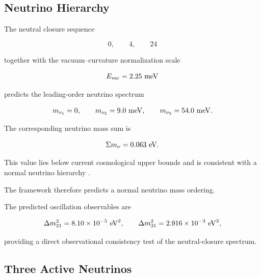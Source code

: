 \documentclass[11pt]{article}
\theoremstyle{definition}
\theoremstyle{remark}
\begin{document}

\subsection{Neutrino Hierarchy}
\label{subsec:prediction_neutrino_hierarchy}

The neutral closure sequence

\begin{equation}
0,
\qquad
4,
\qquad
24
\end{equation}

together with the vacuum--curvature normalization scale

\begin{equation}
E_{\rm vac}
=
2.25~{\rm meV}
\end{equation}

predicts the leading-order neutrino spectrum

\begin{equation}
m_{\nu_1}
=
0,
\qquad
m_{\nu_2}
=
9.0~{\rm meV},
\qquad
m_{\nu_3}
=
54.0~{\rm meV}.
\end{equation}

The corresponding neutrino mass sum is

\begin{equation}
\Sigma m_\nu
=
0.063~{\rm eV}.
\end{equation}

This value lies below current cosmological upper bounds and is
consistent with a normal neutrino hierarchy
\cite{Planck2018,PDG2024}.

The framework therefore predicts a normal neutrino mass ordering.

The predicted oscillation observables are

\begin{equation}
\Delta m_{21}^{2}
=
8.10\times10^{-5}
~{\rm eV}^{2},
\qquad
\Delta m_{31}^{2}
=
2.916\times10^{-3}
~{\rm eV}^{2},
\end{equation}

providing a direct observational consistency test of the
neutral-closure spectrum.


\subsection{Three Active Neutrinos}
\label{subsec:prediction_three_active_neutrinos}
\end{document}
